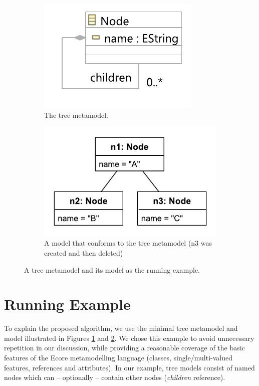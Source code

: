 \documentclass{llncs}
\begin{document}
\begin{figure}[ht]
    \begin{subfigure}[t]{0.4\linewidth}
        \centering
        \includegraphics[width=0.8\linewidth]{node_metamodel}
        \caption{The tree metamodel.}
        \label{fig:tree_metamodel}
    \end{subfigure}
    \hfill
    \begin{subfigure}[t]{0.6\linewidth}
        \centering
        \includegraphics[width=0.6\linewidth]{initial_chart}
        \caption{A model that conforms to the tree metamodel (n3 was created and then deleted)}
        \label{fig:initial_model}
    \end{subfigure}
    \caption{A tree metamodel and its model as the running example.}
    \label{fig:append_speed}
\end{figure}

\section{Running Example}
\label{sec:case_study}
To explain the proposed algorithm, we use the minimal tree metamodel and model illustrated in Figures \ref{fig:tree_metamodel} and \ref{fig:initial_model}. We chose this example to avoid unnecessary repetition in our discussion, while providing a reasonable coverage of the basic features of the Ecore metamodelling language (classes, single/multi-valued features, references and attributes). In our example, tree models consist of named nodes which can -- optionally -- contain other nodes (\emph{children} reference).
\end{document}
